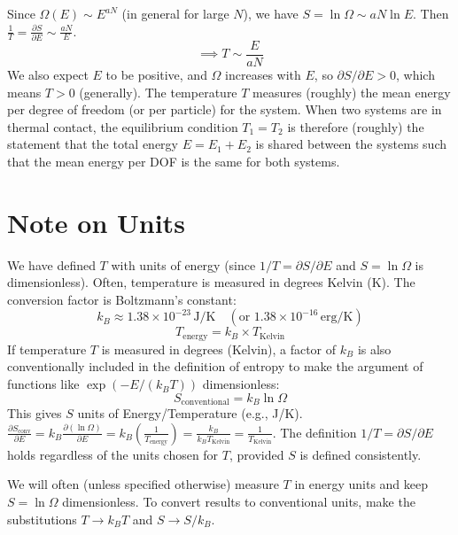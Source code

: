 \documentclass[11pt]{article}
\newcommand{\pderiv}[2]{\frac{\partial #1}{\partial #2}}
\newcommand{\OmegaE}{\Omega(E)}
\newcommand{\kb}{k_B} %
\begin{document}
Since $\OmegaE \sim E^{aN}$ (in general for large $N$), we have $S = \ln \Omega \sim aN \ln E$.
Then $\frac{1}{T} = \pderiv{S}{E} \sim \frac{aN}{E}$.
\[ \implies T \sim \frac{E}{aN} \]
We also expect $E$ to be positive, and $\Omega$ increases with $E$, so $\partial S/\partial E > 0$, which means $T>0$ (generally).
The temperature $T$ measures (roughly) the mean energy per degree of freedom (or per particle) for the system.
When two systems are in thermal contact, the equilibrium condition $T_1=T_2$ is therefore (roughly) the statement that the total energy $E=E_1+E_2$ is shared between the systems such that the mean energy per DOF is the same for both systems.

\section*{Note on Units}

We have defined $T$ with units of energy (since $1/T = \partial S / \partial E$ and $S=\ln\Omega$ is dimensionless).
Often, temperature is measured in degrees Kelvin (K). The conversion factor is Boltzmann's constant:
\[ k_B \approx 1.38 \times 10^{-23} \, \text{J/K} \quad (\text{or } 1.38 \times 10^{-16} \, \text{erg/K}) \]
\[ T_{\text{energy}} = k_B \times T_{\text{Kelvin}} \]
If temperature $T$ is measured in degrees (Kelvin), a factor of $k_B$ is also conventionally included in the definition of entropy to make the argument of functions like $\exp(-E/(\kb T))$ dimensionless:
\[ S_{\text{conventional}} = k_B \ln \Omega \]
This gives $S$ units of Energy/Temperature (e.g., J/K).
$\pderiv{S_{\text{conv}}}{E} = k_B \pderiv{(\ln \Omega)}{E} = k_B \left( \frac{1}{T_{\text{energy}}} \right) = \frac{k_B}{k_B T_{\text{Kelvin}}} = \frac{1}{T_{\text{Kelvin}}}$.
The definition $1/T = \partial S/\partial E$ holds regardless of the units chosen for $T$, provided $S$ is defined consistently.

We will often (unless specified otherwise) measure $T$ in energy units and keep $S = \ln \Omega$ dimensionless. To convert results to conventional units, make the substitutions $T \to \kb T$ and $S \to S/\kb$.
\end{document}
